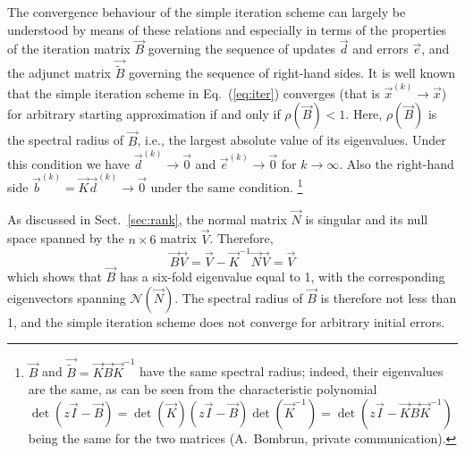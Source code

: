 \documentclass[structabstract]{aa}
\begin{document}
The convergence behaviour of the simple iteration scheme can
largely be understood by means of these relations and especially in
terms of the properties of the iteration matrix $\vec{B}$ governing
the sequence of updates $\vec{d}$ and errors $\vec{e}$, and the 
adjunct matrix $\vec{\tilde{B}}$ governing
the sequence of right-hand sides. It is well known
\citep[e.g.,][]{axelsson96} that the simple iteration scheme in
Eq.~(\ref{eq:iter}) converges (that is $\vec{x}^{(k)}\rightarrow\vec{x}$)
for arbitrary starting approximation if and only if $\rho(\vec{B})<1$.
Here, $\rho(\vec{B})$ is the spectral radius of $\vec{B}$, i.e., the
largest absolute value of its eigenvalues. Under this condition we
have $\vec{d}^{(k)}\rightarrow\vec{0}$ and
$\vec{e}^{(k)}\rightarrow\vec{0}$ for $k\rightarrow\infty$.
Also the right-hand side
$\vec{b}^{(k)}=\vec{K}\vec{d}^{(k)}\rightarrow\vec{0}$
under the same condition.%
\footnote{$\vec{B}$ and $\vec{\tilde{B}}=\vec{K}\vec{B}\vec{K}^{-1}$
have the same spectral radius; indeed, their eigenvalues are the same,
as can be seen from the characteristic polynomial
$\det(z\vec{I}-\vec{B})=\det(\vec{K})(z\vec{I}-\vec{B})\det(\vec{K}^{-1})
=\det(z\vec{I}-\vec{K}\vec{B}\vec{K}^{-1})$ being the same for the
two matrices (A.~Bombrun, private communication).}

As discussed in Sect.~\ref{sec:rank}, the normal matrix $\vec{N}$ is 
singular and its null space spanned by the $n\times 6$ matrix $\vec{V}$. 
Therefore,
\begin{equation}\label{eq:eigenV}
\vec{B}\vec{V}=\vec{V}-\vec{K}^{-1}\vec{N}\vec{V}=\vec{V}
\end{equation}
which shows that $\vec{B}$ has a six-fold eigenvalue equal to 1, with
the corresponding eigenvectors spanning $\mathcal{N}(\vec{N})$. The
spectral radius of $\vec{B}$ is therefore not less than 1, and the simple
iteration scheme does not converge for arbitrary initial errors.
\end{document}
